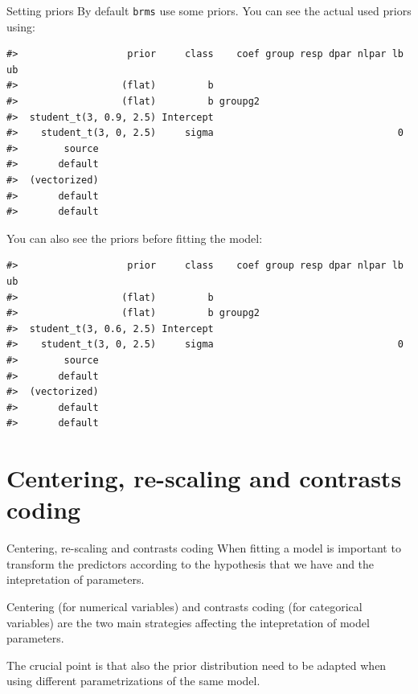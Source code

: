 \documentclass[
  ignorenonframetext,
]{beamer}
\begin{document}
\begin{frame}[fragile]{Setting priors}
\label{setting-priors}
By default \texttt{brms} use some priors. You can see the actual used
priors using:

\begin{verbatim}
#>                   prior     class    coef group resp dpar nlpar lb ub
#>                  (flat)         b                                    
#>                  (flat)         b groupg2                            
#>  student_t(3, 0.9, 2.5) Intercept                                    
#>    student_t(3, 0, 2.5)     sigma                                0   
#>        source
#>       default
#>  (vectorized)
#>       default
#>       default
\end{verbatim}

You can also see the priors before fitting the model:

\begin{verbatim}
#>                   prior     class    coef group resp dpar nlpar lb ub
#>                  (flat)         b                                    
#>                  (flat)         b groupg2                            
#>  student_t(3, 0.6, 2.5) Intercept                                    
#>    student_t(3, 0, 2.5)     sigma                                0   
#>        source
#>       default
#>  (vectorized)
#>       default
#>       default
\end{verbatim}
\end{frame}

\section{Centering, re-scaling and contrasts
coding}\label{centering-re-scaling-and-contrasts-coding}

\begin{frame}{Centering, re-scaling and contrasts coding}
\label{centering-re-scaling-and-contrasts-coding-1}
When fitting a model is important to transform the predictors according
to the hypothesis that we have and the intepretation of parameters.

Centering (for numerical variables) and contrasts coding (for
categorical variables) are the two main strategies affecting the
intepretation of model parameters.

The crucial point is that also the prior distribution need to be adapted
when using different parametrizations of the same model.
\end{frame}
\end{document}
